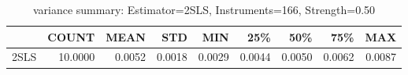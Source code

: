 \begin{table}[ht]
\centering
\caption{variance summary: Estimator=2SLS, Instruments=166, Strength=0.50}
\begin{tabular}{lrrrrrrrr}
\toprule
 & COUNT & MEAN & STD & MIN & 25\% & 50\% & 75\% & MAX \\
\midrule
2SLS & 10.0000 & 0.0052 & 0.0018 & 0.0029 & 0.0044 & 0.0050 & 0.0062 & 0.0087 \\
\bottomrule
\end{tabular}
\end{table}
